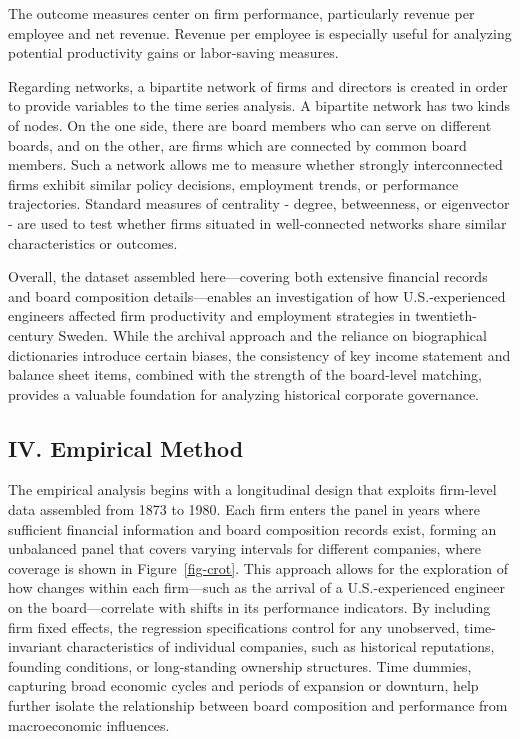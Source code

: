 \documentclass[
]{article}
\begin{document}
The outcome measures center on firm performance, particularly revenue
per employee and net revenue. Revenue per employee is especially useful
for analyzing potential productivity gains or labor-saving measures.

Regarding networks, a bipartite network of firms and directors is
created in order to provide variables to the time series analysis. A
bipartite network has two kinds of nodes. On the one side, there are
board members who can serve on different boards, and on the other, are
firms which are connected by common board members. Such a network allows
me to measure whether strongly interconnected firms exhibit similar
policy decisions, employment trends, or performance trajectories.
Standard measures of centrality - degree, betweenness, or eigenvector -
are used to test whether firms situated in well-connected networks share
similar characteristics or outcomes.

Overall, the dataset assembled here---covering both extensive financial
records and board composition details---enables an investigation of how
U.S.-experienced engineers affected firm productivity and employment
strategies in twentieth-century Sweden. While the archival approach and
the reliance on biographical dictionaries introduce certain biases, the
consistency of key income statement and balance sheet items, combined
with the strength of the board-level matching, provides a valuable
foundation for analyzing historical corporate governance.

\subsection{IV. Empirical Method}\label{iv.-empirical-method-1}

The empirical analysis begins with a longitudinal design that exploits
firm-level data assembled from 1873 to 1980. Each firm enters the panel
in years where sufficient financial information and board composition
records exist, forming an unbalanced panel that covers varying intervals
for different companies, where coverage is shown in
Figure~\ref{fig-crot}. This approach allows for the exploration of how
changes within each firm---such as the arrival of a U.S.-experienced
engineer on the board---correlate with shifts in its performance
indicators. By including firm fixed effects, the regression
specifications control for any unobserved, time-invariant
characteristics of individual companies, such as historical reputations,
founding conditions, or long-standing ownership structures. Time
dummies, capturing broad economic cycles and periods of expansion or
downturn, help further isolate the relationship between board
composition and performance from macroeconomic influences.
\end{document}
